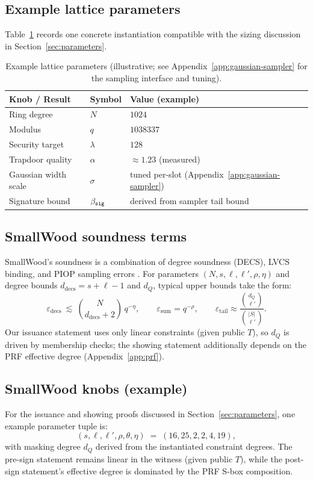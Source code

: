 \subsection{Example lattice parameters}
Table~\ref{tab:lattice-params} records one concrete instantiation compatible with the sizing discussion in
Section~\ref{sec:parameters}.

\begin{table}[H]
\centering
\renewcommand{\arraystretch}{1.15}
\begin{tabular}{@{}lll@{}}
\toprule
\textbf{Knob / Result} & \textbf{Symbol} & \textbf{Value (example)} \\
\midrule
Ring degree & \(N\) & \(1024\) \\
Modulus & \(q\) & \(1038337\) \\
Security target & \(\lambda\) & \(128\) \\
\midrule
Trapdoor quality & \(\alpha\) & \(\approx 1.23\) (measured) \\
Gaussian width scale & \(\sigma\) & tuned per-slot (Appendix~\ref{app:gaussian-sampler}) \\
Signature bound & \(\beta_{\mathtt{sig}}\) & derived from sampler tail bound \\
\bottomrule
\end{tabular}
\caption{Example lattice parameters (illustrative; see Appendix~\ref{app:gaussian-sampler} for the sampling interface and
tuning).}
\label{tab:lattice-params}
\end{table}

\subsection{SmallWood soundness terms}
SmallWood’s soundness is a combination of degree soundness (DECS), LVCS binding, and PIOP sampling errors
\cite{EPRINT:FenRiv25b}. For parameters \((N,s,\ell,\ell',\rho,\eta)\) and degree bounds \(d_{\mathrm{decs}}=s+\ell-1\)
and \(d_Q\), typical upper bounds take the form:
\[
\varepsilon_{\mathrm{decs}}\ \lesssim\ \binom{N}{d_{\mathrm{decs}}+2}\,q^{-\eta},
\qquad
\varepsilon_{\mathrm{sum}} = q^{-\rho},
\qquad
\varepsilon_{\mathrm{tail}} \approx \frac{\binom{d_Q}{\ell'}}{\binom{|S|}{\ell'}}.
\]
Our issuance statement uses only linear constraints (given public \(T\)), so \(d_Q\) is driven by membership checks; the
showing statement additionally depends on the PRF effective degree (Appendix~\ref{app:prf}).

\subsection{SmallWood knobs (example)}
For the issuance and showing proofs discussed in Section~\ref{sec:parameters}, one example parameter tuple is:
\[
  (s,\ell,\ell',\rho,\theta,\eta)\;=\;(16,25,2,2,4,19),
\]
with masking degree \(d_Q\) derived from the instantiated constraint degrees. The pre-sign statement remains linear in
the witness (given public \(T\)), while the post-sign statement’s effective degree is dominated by the PRF S-box
composition.

